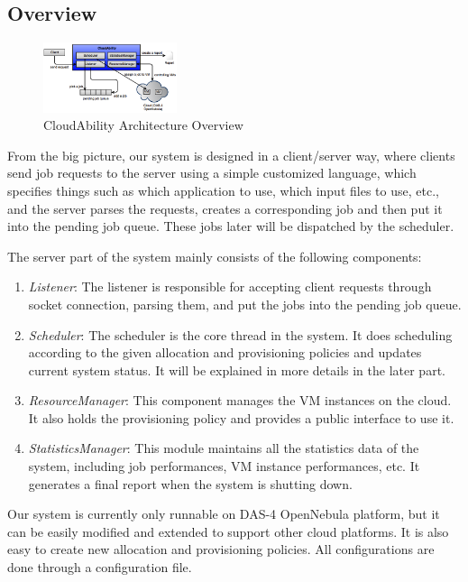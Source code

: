 

\subsection{Overview}

\begin{figure}[!t]
\centering
\includegraphics[width=0.35\textwidth]{pictures/system-arch.png}
\caption{CloudAbility Architecture Overview}
\label{figure_system_arch}
\end{figure}

From the big picture, our system is designed in a client/server way, where clients send job requests to the server using a simple customized language, which specifies things such as which application to use, which input files to use, etc., and the server parses the requests, creates a corresponding job and then put it into the pending job queue. These jobs later will be dispatched by the scheduler.

The server part of the system mainly consists of the following components:

\begin{enumerate}
\item \emph{Listener}: The listener is responsible for accepting client requests through socket connection, parsing them, and put the jobs into the pending job queue.
\item \emph{Scheduler}: The scheduler is the core thread in the system. It does scheduling according to the given allocation and provisioning policies and updates current system status. It will be explained in more details in the later part.
\item \emph{ResourceManager}: This component manages the VM instances on the cloud. It also holds the provisioning policy and provides a public interface to use it.
\item \emph{StatisticsManager}: This module maintains all the statistics data of the system, including job performances, VM instance performances, etc. It generates a final report when the system is shutting down.
\end{enumerate}

Our system is currently only runnable on DAS-4 OpenNebula platform, but it can be easily modified and extended to support other cloud platforms. It is also easy to create new allocation and provisioning policies. All configurations are done through a configuration file.


